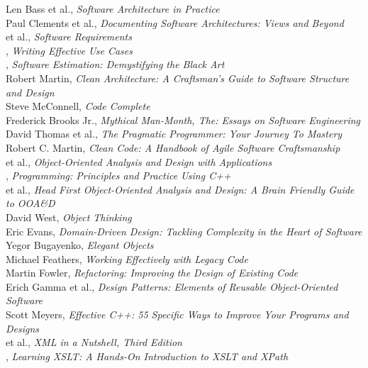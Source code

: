 \documentclass[nobrand,anonymous,nodate,nosecurity]{huawei}
\begin{document}
\begin{multicols}{2}\small\raggedright
Len Bass et al., \emph{Software Architecture in Practice}\\
Paul Clements et al., \emph{Documenting Software Architectures: Views and Beyond}\\
 et al., \emph{Software Requirements}\\
{}, \emph{Writing Effective Use Cases}\\
{}, \emph{Software Estimation: Demystifying the Black Art}\\
{Robert Martin}, \emph{Clean Architecture: A Craftsman's Guide to Software Structure and Design}\\
{Steve McConnell}, \emph{Code Complete}\\
{Frederick Brooks Jr.}, \emph{Mythical Man-Month, The: Essays on Software Engineering}\\
{David Thomas et al.}, \emph{The Pragmatic Programmer: Your Journey To Mastery}\\
{Robert C. Martin}, \emph{Clean Code: A Handbook of Agile Software Craftsmanship}\\
{ et al.}, \emph{Object-Oriented Analysis and Design with Applications}\\
{}, \emph{Programming: Principles and Practice Using C++}\\
{ et al.}, \emph{Head First Object-Oriented Analysis and Design: A Brain Friendly Guide to OOA\&D}\\
{David West}, \emph{Object Thinking}\\
{Eric Evans}, \emph{Domain-Driven Design: Tackling Complexity in the Heart of Software}\\
{Yegor Bugayenko}, \emph{Elegant Objects}\\
{Michael Feathers}, \emph{Working Effectively with Legacy Code}\\
{Martin Fowler}, \emph{Refactoring: Improving the Design of Existing Code}\\
{Erich Gamma et al.}, \emph{Design Patterns: Elements of Reusable Object-Oriented Software}\\
{Scott Meyers}, \emph{Effective C++: 55 Specific Ways to Improve Your Programs and Designs}\\
{ et al.}, \emph{XML in a Nutshell, Third Edition}\\
{}, \emph{Learning XSLT: A Hands-On Introduction to XSLT and XPath}\\

\end{multicols}
\end{document}
